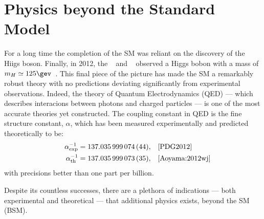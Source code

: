 \section{Physics beyond the Standard Model}
\label{sec:bsm}

For a long time the completion of the SM was reliant on the discovery of the Hiigs boson.
Finally, in 2012, the \cms~\cite{Chatrchyan:2008aa} and \atlas~\cite{Aad:2008zzm} observed a Higgs
bobon with a mass of $m_H\simeq125\gev$~\cite{Chatrchyan:2012ufa,Aad:2012tfa}.
This final piece of the picture has made the SM a remarkably robust theory with no predictions
deviating significantly from experimental observations.
Indeed, the theory of Quantum Electrodynamics (QED) --- which describes interacions between
photons and charged particles --- is one of the most accurate theories yet constructed.
The coupling constant in QED is the fine structure constant, $\alpha$, which has been measured
experimentally and predicted theoretically to be:
\begin{align}
  \phantom{.} &&\alpha^{-1}_\mathrm{exp} &= 137.035\,999\,074\,(44), && \text{\cite{PDG2012}} \nonumber\\
  \phantom{.} &&\alpha^{-1}_\mathrm{th} &= 137.035\,999\,073\,(35), && \text{\cite{Aoyama:2012wj}}
\end{align}
with precisions better than one part per billion.



Despite its countless successes, there are a plethora of indications --- both
experimental and theoretical --- that additional physics exists, beyond the SM (BSM).



